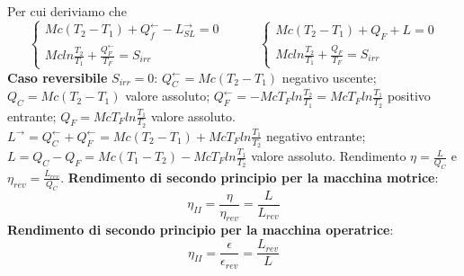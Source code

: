 Per cui deriviamo che
\[
    \begin{cases}
        Mc(T_2-T_1) + Q_f^\leftarrow - L_{SL}^\rightarrow  = 0\\
        Mc ln \frac{T_2}{T_1} + \frac{Q_F^\leftarrow}{T_F} = S_{irr}
    \end{cases} \;\;\;\;\;\;\;\;\;\; \begin{cases}
        Mc(T_2-T_1) + Q_F + L = 0\\ Mc ln \frac{T_2}{T_1} + \frac{Q_F}{T_F} = S_{irr}
    \end{cases}
\]
\textbf{Caso reversibile} $S_{irr} = 0$:
$Q_C^\leftarrow =  Mc(T_2-T_1)$ negativo uscente; \newline
$Q_C =  Mc(T_2-T_1)$ valore assoluto; \newline
\newline
$Q_F^\leftarrow  = - Mc T_F ln \frac{T_2}{T_1} = Mc T_F ln \frac{T_1}{T_2}$ positivo entrante;\newline
$Q_F = Mc T_F ln \frac{T_1}{T_2}$ valore assoluto.\newline
\newline
$L^\rightarrow  = Q_C^\leftarrow  + Q_F^\leftarrow  = Mc(T_2 -T_1) + Mc T_F ln \frac{T_1}{T_2}$ negativo entrante;\newline
$L = Q_C- Q_F = Mc (T_1-T_2) - McT_F ln \frac{T_1}{T_2}$ valore assoluto.\newline
\newline
Rendimento $\eta = \frac{L}{Q_C}$ e $\eta_{rev} = \frac{L_{rev}}{Q_C}$.\newline
\newline
\textbf{Rendimento di secondo principio per la macchina motrice}:
\[
    \eta_{II} = \frac{\eta}{\eta_{rev}} = \frac{L}{L_{rev}}
\]
\textbf{Rendimento di secondo principio per la macchina operatrice}:
\[
    \eta_{II} = \frac{\epsilon}{\epsilon_{rev}} = \frac{L_{rev}}{L}
\]